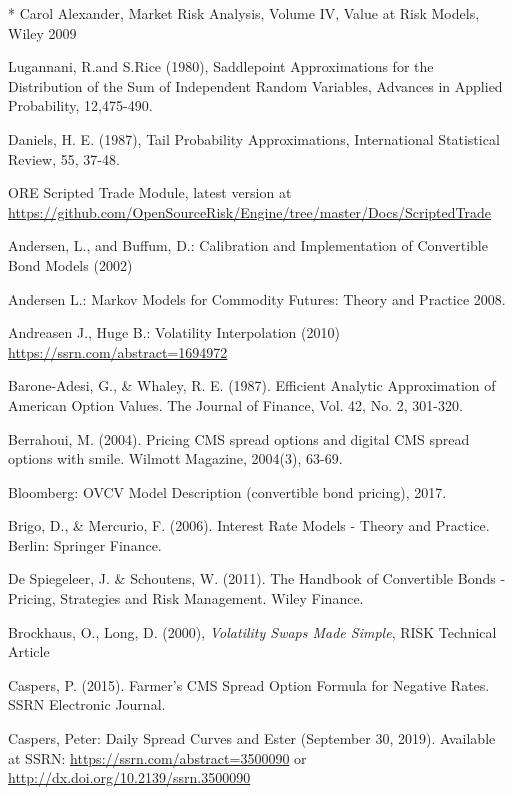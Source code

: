 \begin{thebibliography}{*}
 Carol Alexander, Market Risk Analysis, Volume IV, Value at Risk Models, Wiley 2009

 Lugannani, R.and S.Rice (1980), Saddlepoint Approximations for the Distribution of the Sum of
  Independent Random Variables, Advances in Applied Probability, 12,475-490.

 Daniels, H. E. (1987), Tail Probability Approximations, International Statistical Review, 55, 37-48.

 ORE Scripted Trade Module, latest version at \url{https://github.com/OpenSourceRisk/Engine/tree/master/Docs/ScriptedTrade}

   Andersen, L., and Buffum, D.: Calibration and Implementation of Convertible Bond Models (2002)

  Andersen L.: Markov Models for Commodity Futures: Theory and Practice  2008.

 Andreasen J., Huge B.: Volatility Interpolation (2010) \url{https://ssrn.com/abstract=1694972}

 Barone-Adesi, G., \& Whaley, R. E. (1987). Efficient Analytic Approximation of American Option Values. The Journal of Finance, Vol. 42, No. 2, 301-320.

 Berrahoui, M. (2004). Pricing CMS spread options and digital CMS spread options with smile. Wilmott Magazine, 2004(3), 63-69.

 Bloomberg: OVCV Model Description (convertible bond pricing), 2017.

 Brigo, D., \& Mercurio, F. (2006). Interest Rate Models - Theory and Practice. Berlin: Springer Finance.

 De Spiegeleer, J. \& Schoutens, W. (2011). The Handbook of Convertible Bonds - Pricing, Strategies and Risk Management. Wiley Finance.

 Brockhaus, O., Long, D. (2000), {\em Volatility Swaps Made Simple}, RISK Technical Article

 Caspers, P. (2015). Farmer's CMS Spread Option Formula for Negative Rates. SSRN Electronic Journal.

 Caspers, Peter: Daily Spread Curves and Ester (September 30, 2019). Available at SSRN:
  \url{https://ssrn.com/abstract=3500090} or \url{http://dx.doi.org/10.2139/ssrn.3500090}


\end{thebibliography}
